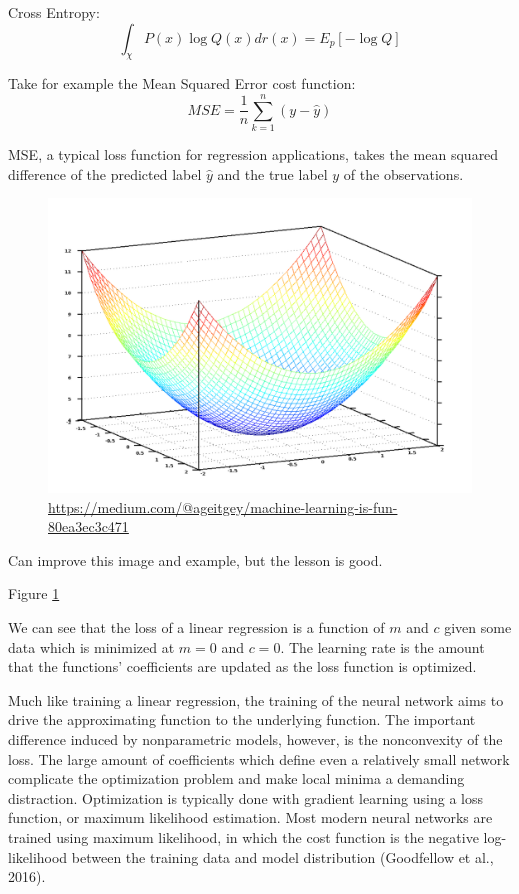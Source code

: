\documentclass[12pt,twoside]{reedthesis}
\begin{document}
Cross Entropy: \[
\int_\chi P(x) \log Q (x) dr(x) = E_p [- \log Q]
\]

Take for example the Mean Squared Error cost function: \[
MSE = \frac{1}{n} \sum_{k=1}^n  (y - \hat y)
\]

MSE, a typical loss function for regression applications, takes the mean
squared difference of the predicted label \(\hat y\) and the true label
\(y\) of the observations.
\begin{figure}
\centering
\includegraphics{figure/optimize.png}
\caption{\label{fig:optimize}\url{https://medium.com/@ageitgey/machine-learning-is-fun-80ea3ec3c471}}
\end{figure}
Can improve this image and example, but the lesson is good.

Figure \ref{fig:optimize}

We can see that the loss of a linear regression is a function of \(m\)
and \(c\) given some data which is minimized at \(m = 0\) and \(c = 0\).
The learning rate is the amount that the functions' coefficients are
updated as the loss function is optimized.

Much like training a linear regression, the training of the neural
network aims to drive the approximating function to the underlying
function. The important difference induced by nonparametric models,
however, is the nonconvexity of the loss. The large amount of
coefficients which define even a relatively small network complicate the
optimization problem and make local minima a demanding distraction.
Optimization is typically done with gradient learning using a loss
function, or maximum likelihood estimation. Most modern neural networks
are trained using maximum likelihood, in which the cost function is the
negative log-likelihood between the training data and model distribution
(Goodfellow et al., 2016).
\end{document}
